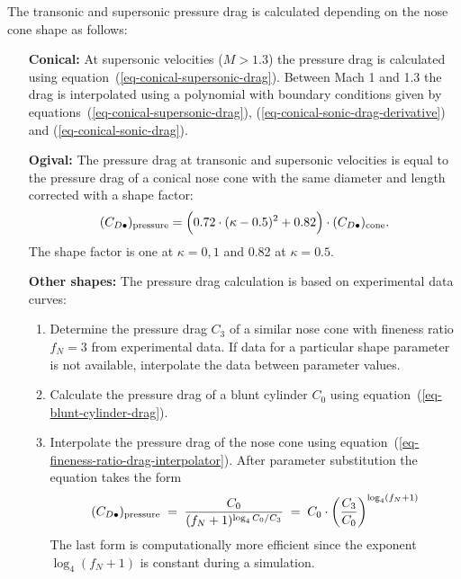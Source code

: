 The transonic and supersonic pressure drag is calculated depending on
the nose cone shape as follows:
%
\begin{itemize}

\item[\bf Conical:]  At supersonic velocities ($M > 1.3$) the
  pressure drag is calculated using
  equation~(\ref{eq-conical-supersonic-drag}).  Between Mach 1 and 1.3
  the drag is interpolated using a polynomial with boundary conditions
  given by equations~(\ref{eq-conical-supersonic-drag}),
  (\ref{eq-conical-sonic-drag-derivative}) and
  (\ref{eq-conical-sonic-drag}).
\\



\item[\bf Ogival:]  The pressure drag at transonic and supersonic
  velocities is equal to the pressure drag of a conical nose cone with
  the same diameter and length corrected with a shape factor:
%
\begin{equation}
(C_{D\bullet})_{\rm pressure} = 
\del{0.72 \cdot (\kappa - 0.5)^2 + 0.82} \cdot 
(C_{D\bullet})_{\rm cone}.
\end{equation}
%
The shape factor is one at $\kappa = 0, 1$ and 0.82 at $\kappa=0.5$.
\\



\item[\bf Other shapes:]  The pressure drag calculation is based on
  experimental data curves:
%
\begin{enumerate}
\item Determine the pressure drag $C_3$ of a similar nose cone
  with fineness ratio $f_N=3$ from experimental data.  If data for a
  particular shape parameter is not available, interpolate the data
  between parameter values.

\item Calculate the pressure drag of a blunt cylinder $C_0$
  using equation~(\ref{eq-blunt-cylinder-drag}).

\item Interpolate the pressure drag of the nose cone using
  equation~(\ref{eq-fineness-ratio-drag-interpolator}).
  After parameter substitution the equation takes the form
%
\begin{equation}
(C_{D\bullet})_{\rm pressure} \;=\;
\frac{C_0}{(f_N+1)^{\log_4 C_0/C_3}} \;=\;
C_0 \cdot \del{\frac{C_3}{C_0}}^{\log_4(f_N+1)}
\end{equation}
%
  The last form is computationally more efficient since the exponent
  $\log_4(f_N+1)$ is constant during a simulation.

\end{enumerate}

\end{itemize}











